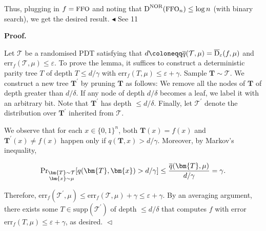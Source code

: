 Thus, plugging in $f={\textrm{\small{FFO}}}$ and noting that ${\textup{D}}^{{\textrm{\small{\scriptsize NOR}}}}({\textrm{\small{FFO}}}_{n})\leq\log n$ (with binary search), we get the desired result.
$\blacktriangleleft$
See 11\par





\par\medskip\noindent\textbf{
\textbf{Proof}.}\par




Let $\mathcal{T}$ be a randomised PDT satisfying that $d\coloneqq\overline{q}(\mathcal{T},\mu)=\overline{{\textup{D}}}_{\varepsilon}(f,\mu)$ and $\mathrm{err}_{f}(\mathcal{T},\mu)\leq\varepsilon$.
To prove the lemma, it suffices to construct a deterministic parity tree $T$ of depth $T\leq d/\gamma$ with $\mathrm{err}_{f}(T,\mu)\leq\varepsilon+\gamma$. Sample $\bm{T}\sim\mathcal{T}$. We construct a new tree $\bm{T}^{\prime}$ by pruning $\bm{T}$ as follows: We remove all the nodes of $\bm{T}$ of depth greater than $d/\delta$. If any node of depth $d/\delta$ becomes a leaf, we label it with an arbitrary bit. Note that $\bm{T}^{\prime}$ has depth $\leq d/\delta$. Finally, let $\mathcal{T}^{\prime}$ denote the distribution over $\bm{T}^{\prime}$ inherited from $\mathcal{T}$.\par




We observe that for each $x\in\{0,1\}^{n}$, both $\bm{T}(x)=f(x)$ and $\bm{T}^{\prime}(x)\neq f(x)$ happen only if $q(\bm{T},x)>d/\gamma$. Moreover, by Markov’s inequality,\par


\[\begin{gathered}
\Pr\nolimits_{\begin{subarray}{c}\bm{T}\sim\mathcal{T}\\
\bm{x}\sim\mu\end{subarray}}[q(\bm{T},\bm{x})>d/\gamma]\leq\frac{\overline{q}(\bm{T},\mu)}{d/\gamma}=\gamma.
\end{gathered}\]


Therefore, $\mathrm{err}_{f}(\mathcal{T}^{\prime},\mu)\leq\mathrm{err}_{f}(\mathcal{T},\mu)+\gamma\leq\varepsilon+\gamma$. By an averaging argument, there exists some $T\in\mathrm{supp}(\mathcal{T}^{\prime})$ of depth $\leq d/\delta$ that computes $f$ with error $\mathrm{err}_{f}(T,\mu)\leq\varepsilon+\gamma$, as desired.
$\vartriangleleft$\par






